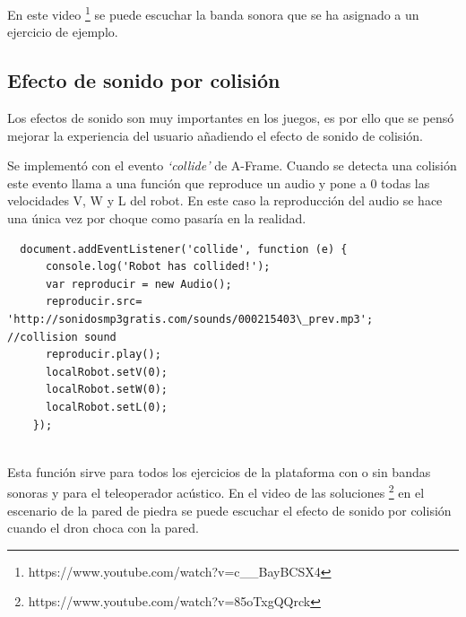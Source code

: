 En este video \footnote{https://www.youtube.com/watch?v=c\_\_BayBCSX4} se puede escuchar la banda sonora que se ha asignado a un ejercicio de ejemplo.

\subsection{Efecto de sonido por colisión }

Los efectos de sonido son muy importantes en los juegos, es por ello que se pensó mejorar la experiencia del usuario añadiendo el efecto de sonido de colisión. 

Se implementó con el evento \textit{`collide'} de A-Frame. Cuando se detecta una colisión este evento llama a una función que reproduce un audio y pone a 0 todas las velocidades V, W y L del robot.  En este caso la reproducción del audio se hace una única vez por choque como pasaría en la realidad.

\begin{lstlisting}
  document.addEventListener('collide', function (e) {
      console.log('Robot has collided!');
      var reproducir = new Audio();
      reproducir.src= 'http://sonidosmp3gratis.com/sounds/000215403\_prev.mp3';   //collision sound
      reproducir.play();
      localRobot.setV(0);
      localRobot.setW(0);
      localRobot.setL(0);
	});
	
\end{lstlisting}

Esta función sirve para todos los ejercicios de la plataforma con o sin  bandas sonoras y para el teleoperador acústico. En el video de las soluciones  \footnote{https://www.youtube.com/watch?v=85oTxgQQrck}  en el escenario de la pared de piedra se puede escuchar el efecto de sonido por colisión cuando el dron choca con la pared.